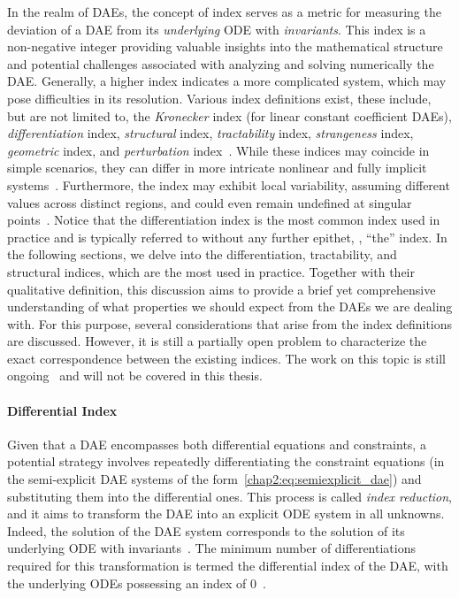 In the realm of \acp{DAE}, the concept of index serves as a metric for measuring the deviation of a \ac{DAE} from its \emph{underlying} \ac{ODE} with \emph{invariants}. This index is a non-negative integer providing valuable insights into the mathematical structure and potential challenges associated with analyzing and solving numerically the \ac{DAE}. Generally, a higher index indicates a more complicated system, which may pose difficulties in its resolution. Various index definitions exist, these include, but are not limited to, the \emph{Kronecker} index (for linear constant coefficient \acp{DAE}), \emph{differentiation} index, \emph{structural} index, \emph{tractability} index, \emph{strangeness} index, \emph{geometric} index, and \emph{perturbation} index~\cite{mehrmann2015index}. While these indices may coincide in simple scenarios, they can differ in more intricate nonlinear and fully implicit systems~\cite{lamour2012detecting}. Furthermore, the index may exhibit local variability, assuming different values across distinct regions, and could even remain undefined at singular points~\cite{lamour2012detecting}. Notice that the differentiation index is the most common index used in practice and is typically referred to without any further epithet, \ie{}, ``the'' index. In the following sections, we delve into the differentiation, tractability, and structural indices, which are the most used in practice. Together with their qualitative definition, this discussion aims to provide a brief yet comprehensive understanding of what properties we should expect from the \acp{DAE} we are dealing with.
For this purpose, several considerations that arise from the index definitions are discussed. However, it is still a partially open problem to characterize the exact correspondence between the existing indices. The work on this topic is still ongoing~\cite{mehrmann2015index} and will not be covered in this thesis.

\paragraph{Differential Index}

Given that a \ac{DAE} encompasses both differential equations and constraints, a potential strategy involves repeatedly differentiating the constraint equations (in the semi-explicit \ac{DAE} systems of the form~\eqref{chap2:eq:semiexplicit_dae}) and substituting them into the differential ones. This process is called \emph{index reduction}, and it aims to transform the \ac{DAE} into an explicit \ac{ODE} system in all unknowns. Indeed, the solution of the \ac{DAE} system corresponds to the solution of its underlying \ac{ODE} with invariants~\cite{rheinboldt1984differential}. The minimum number of differentiations required for this transformation is termed the differential index of the \ac{DAE}, with the underlying \acp{ODE} possessing an index of 0~\cite{mehrmann2015index}.

